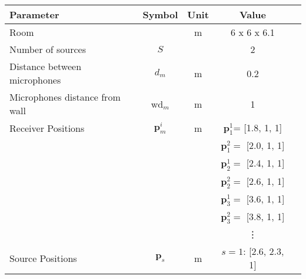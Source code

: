 \begin{table}[htb]
	\centering
	\begin{tabular}{lcccc}
		\toprule
		Parameter                      & Symbol              & Unit & Value                    \\%
		\midrule
		Room                           &                     & m    & 6 x 6 x 6.1              \\%
		Number of sources              & $S$                 &      & 2                        \\%
		Distance between microphones   & $d_m$               & m    & 0.2                      \\%
		Microphones distance from wall & wd$_m$              & m    & 1                        \\%
		Receiver Positions             & $\bm p_m^i$         & m    & $\bm p_1^1$= [1.8, 1, 1] \\%
		                               &                     &      & $\bm p_1^2=$ [2.0, 1, 1] \\%
		                               &                     &      & $\bm p_2^1=$ [2.4, 1, 1] \\%
		                               &                     &      & $\bm p_2^2=$ [2.6, 1, 1] \\%
		                               &                     &      & $\bm p_3^1=$ [3.6, 1, 1] \\%
		                               &                     &      & $\bm p_3^2=$ [3.8, 1, 1] \\%
		                               &                     &      & \vdots                   \\%
		Source Positions               & $\bm p_s$           & m    & $s=1$: [2.6, 2.3, 1]     \\%

\end{tabular}
\end{table}

